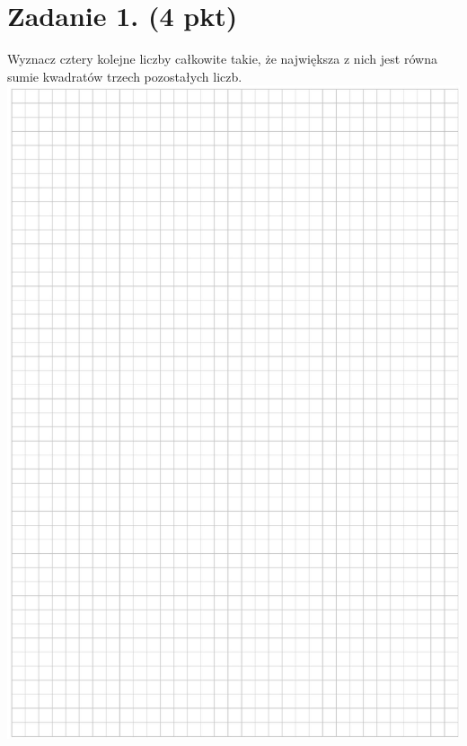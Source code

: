 \documentclass[10pt]{article}
\begin{document}
\section*{Zadanie 1. (4 pkt)}
Wyznacz cztery kolejne liczby całkowite takie, że największa z nich jest równa sumie kwadratów trzech pozostałych liczb.\\
\includegraphics[max width=\textwidth, center]{2024_11_21_606d6e4e152fe3e9f6feg-02}\\
\end{document}
